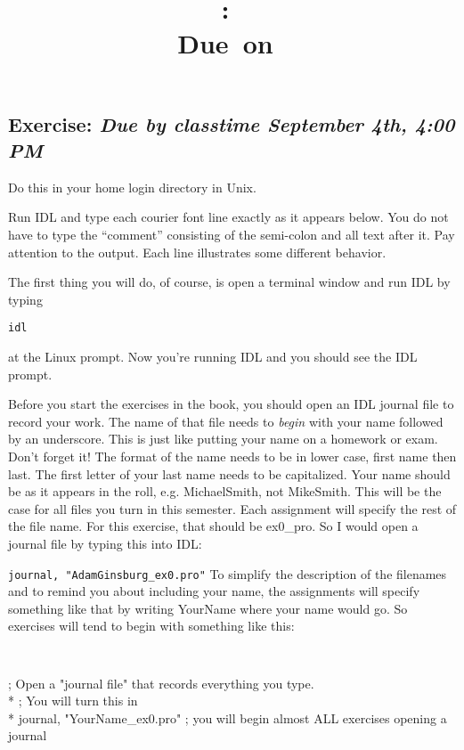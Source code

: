 \documentclass{article}
\title{\vspace{2in}\textmd{\textbf{\hmwkClass:\ \hmwkTitle}}\\\normalsize\vspace{0.1in}\small{Due\ on\ \hmwkDueDate}\\\vspace{0.1in}\large{}\vspace{3in}}
\date{}
\newcommand{\hmwkDueDate}{September 4th, 4:00 PM}
\begin{document}
\begin{spacing}{1.0}
\newpage


\section{\textbf{Exercise:} \emph{  Due by classtime \hmwkDueDate}}
\par

\noindent Do this in your home login directory in Unix.

\noindent Run IDL and type each courier font line exactly as it appears below.  You do not have to type the “comment” consisting of the semi-colon and all text after it.  Pay attention to the output.  Each line illustrates some different behavior.

\noindent The first thing you will do, of course, is open a terminal window and run IDL by typing

\texttt{idl}

at the Linux prompt.  Now you’re running IDL and you should see the IDL prompt.

Before you start the exercises in the book, you should open an IDL journal file
to record your work.  The name of that file needs to \emph{begin} with your
name followed by an underscore.  This is just like putting your name on a
homework or exam.  Don’t forget it!  The format of the name needs to be in
lower case, first name then last.  The first letter of your last name needs to
be capitalized.  Your name should be as it appears in the roll, e.g.
MichaelSmith, not MikeSmith.  This will be the case for all files you turn in
this semester.  Each assignment will specify the rest of the file name.  For
this exercise, that should be ex0\_pro.  So I would open a journal file by
typing this into IDL:

\texttt{journal, "AdamGinsburg\_ex0.pro"}
To simplify the description of the filenames and to remind you about including your name, the assignments will specify something like that by writing YourName where your name would go.  So exercises will tend to begin with something like this:

{\tt
\begin{tabbing}
; Open a "journal file" that records everything you type. \\*
; You will turn this in \\*
journal, "YourName\_ex0.pro"    ; you will begin almost ALL exercises opening a journal \\
\end{tabbing}
}


\end{spacing}
\end{document}

